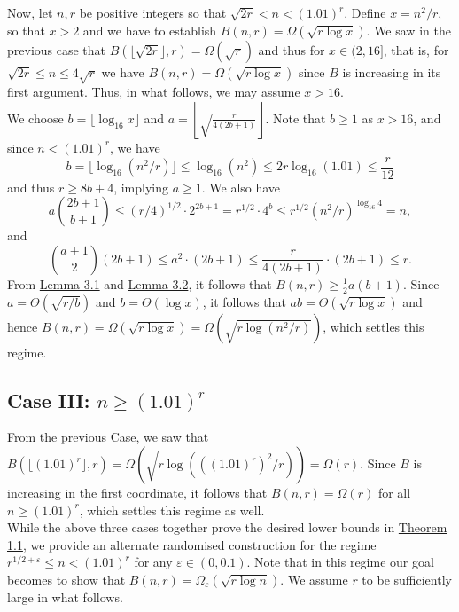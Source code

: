 \documentclass[11pt,a4paper]{article}
\begin{document}
\noindent
Now, let $n, r$ be positive integers so that $\sqrt{2r} < n < (1.01)^r$. Define $x = n^2/r$, so that $x > 2$ and we have to establish $B(n, r) = \Omega \left(\sqrt{r \log x}\right)$. We saw in the previous case that $B(\lfloor \sqrt{2r} \rfloor, r) = \Omega(\sqrt{r})$ and thus for $x \in (2,16]$, that is, for $\sqrt{2r} \leq n \leq 4 \sqrt{r}$ we have $B(n, r) = \Omega(\sqrt{r \log x})$ since $B$ is increasing in its first argument. Thus, in what follows, we may assume $x > 16$. \\

\noindent
We choose $b = \lfloor \log_{16} x \rfloor$ and $a = \left\lfloor \sqrt{\frac{r}{4(2b+1)}} \right\rfloor$. Note that $b \geq 1$ as $x > 16$, and since $n < (1.01)^r$, we have \[b = \lfloor \log_{16}(n^2/r) \rfloor \leq \log_{16}(n^2) \leq 2r\log_{16} (1.01) \leq \frac{r}{12}\]
    and thus $r \geq 8b + 4$, implying $a \geq 1$. We also have \[a \binom{2b+1}{b+1} \leq (r/4)^{1/2} \cdot 2^{2b+1} =r^{1/2} \cdot 4^b \leq r^{1/2} (n^2/r)^{\log_{16} 4} = n,\]
    and \[\binom{a+1}{2} (2b+1) \leq a^2 \cdot (2b+1) \leq \frac{r}{4(2b+1)} \cdot (2b+1) \leq r.\]
    From \hyperref[lem:3:1]{Lemma 3.1} and \hyperref[lem:3:2]{Lemma 3.2}, it follows that $B(n, r) \geq \frac{1}{2}a(b+1)$. Since $a = \Theta \left(\sqrt{r/b}\right)$ and $b = \Theta(\log x)$, it follows that $ab = \Theta \left(\sqrt{r \log x}\right)$ and hence $B(n, r) = \Omega\left(\sqrt{r \log x} \right) = \Omega \left(\sqrt{r \log(n^2/r)}\right)$, which settles this regime.
\subsection*{Case III: $n \geq (1.01)^r$}
From the previous Case, we saw that $B(\lfloor(1.01)^r\rfloor, r) = \Omega \left(\sqrt{r \log (((1.01)^r)^2/r)}\right) = \Omega(r)$. Since $B$ is increasing in the first coordinate, it follows that $B(n, r) = \Omega(r)$ for all $n \ge (1.01)^r$, which settles this regime as well.\\

\noindent
While the above three cases together prove the desired lower bounds in \hyperref[thm:1:1]{Theorem 1.1}, we provide an alternate randomised construction for the regime $r^{1/2+\varepsilon} \leq n < (1.01)^r$ for any $\varepsilon \in (0,0.1)$. Note that in this regime our goal becomes to show that $B(n, r) = \Omega_{\varepsilon} \left(\sqrt{r \log n}\right)$. We assume $r$ to be sufficiently large in what follows.\\
\end{document}
